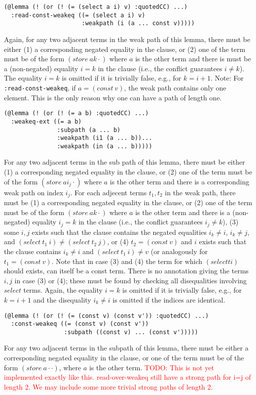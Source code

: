 \documentclass[a4paper]{article}
\newcommand\todo[1]{\textcolor{red}{TODO: #1}}
\begin{document}
\begin{verbatim}
(@lemma (! (or (! (= (select a i) v) :quotedCC) ...)
  :read-const-weakeq ((= (select a i) v)
                      :weakpath (i (a ... const v)))))
\end{verbatim}
Again, for any two adjacent terms in the weak path of this lemma, there must be either
(1) a corresponding negated equality in the clause, or (2) one of the term must be of
the form $(store\ a k \cdot)$ where $a$ is the other term and there is must be
a (non-negated) equality $i=k$ in the clause (i.e., the conflict guarantees $i\neq k$).
The equality $i=k$ is omitted if it is trivially false, e.g., for $k = i+1$.
Note: For \verb+:read-const-weakeq+, if $a = (const\ v)$, the weak path
contains only one element.  This is the only reason why one can have a
path of length one.
\begin{verbatim}
(@lemma (! (or (! (= a b) :quotedCC) ...)
  :weakeq-ext ((= a b)
               :subpath (a ... b)
               :weakpath (i1 (a ... b))...
               :weakpath (in (a ... b)))))
\end{verbatim}
For any two adjacent terms in the sub path of this lemma, there must be either
(1) a corresponding negated equality in the clause, or (2) one of the term must be of
the form $(store\ a i_j \cdot)$ where $a$ is the other term and there is a corresponding
weak path on index $i_j$.  For each adjecent terms $t_1,t_2$ in the weak path, there must be
(1) a corresponding negated equality in the clause, or (2) one of the term must be of
the form $(store\ a k \cdot)$ where $a$ is the other term and there is a
(non-negated) equality $i_j=k$ in the clause (i.e., the conflict guarantees $i_j\neq k$),
(3) some $i,j$ exists such that the clause contains the negated equalities
$i_k\neq i$, $i_k\neq j$, and $(select\ t_1\ i) \neq (select\ t_2\ j)$, or
(4) $t_2 = (const\ v)$ and $i$ exists such that the clause contains
$i_k\neq i$ and $(select\ t_1\ i) \neq v$ (or analogously for $t_1=(const\ v)$.
Note that in case (3) and (4) the term for which $(select t i)$ should exists, can itself
be a const term.  There is no annotation giving the terms $i,j$ in case (3) or (4); these
must be found by checking all disequalities involving $select$ terms.
Again, the equality $i=k$ is omitted if it is trivially false, e.g., for $k = i+1$ and the
disequality $i_k \neq i$ is omitted if the indices are identical.

\begin{verbatim}
(@lemma (! (or (! (= (const v) (const v')) :quotedCC) ...)
  :const-weakeq ((= (const v) (const v'))
                 :subpath ((const v) ... (const v')))))
\end{verbatim}
For any two adjacent terms in the subpath of this lemma, there must be either
a corresponding negated equality in the clause, or one of the term must be of
the form $(store\ a \cdot \cdot)$, where $a$ is the other term.
\todo{This is not yet implemented exactly like this.  read-over-weakeq
  still have a strong path for i=j of length 2.  We may include some more
  trivial strong paths of length 2.}
\end{document}
